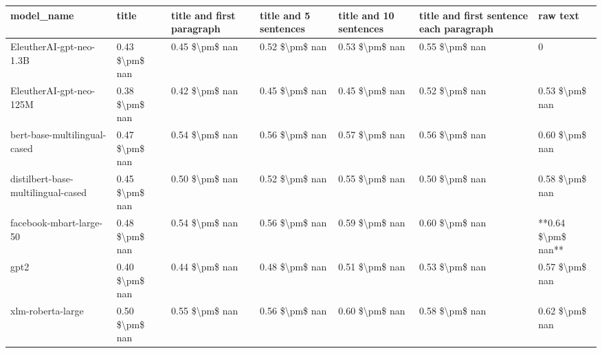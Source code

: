 \begin{tabular}{lllllll}
\toprule
                        model\_name &          title & title and first paragraph & title and 5 sentences & title and 10 sentences & title and first sentence each paragraph &           raw text \\
\midrule
           EleutherAI-gpt-neo-1.3B & 0.43 \$\textbackslash pm\$ nan &            0.45 \$\textbackslash pm\$ nan &        0.52 \$\textbackslash pm\$ nan &         0.53 \$\textbackslash pm\$ nan &                          0.55 \$\textbackslash pm\$ nan &                  0 \\
           EleutherAI-gpt-neo-125M & 0.38 \$\textbackslash pm\$ nan &            0.42 \$\textbackslash pm\$ nan &        0.45 \$\textbackslash pm\$ nan &         0.45 \$\textbackslash pm\$ nan &                          0.52 \$\textbackslash pm\$ nan &     0.53 \$\textbackslash pm\$ nan \\
      bert-base-multilingual-cased & 0.47 \$\textbackslash pm\$ nan &            0.54 \$\textbackslash pm\$ nan &        0.56 \$\textbackslash pm\$ nan &         0.57 \$\textbackslash pm\$ nan &                          0.56 \$\textbackslash pm\$ nan &     0.60 \$\textbackslash pm\$ nan \\
distilbert-base-multilingual-cased & 0.45 \$\textbackslash pm\$ nan &            0.50 \$\textbackslash pm\$ nan &        0.52 \$\textbackslash pm\$ nan &         0.55 \$\textbackslash pm\$ nan &                          0.50 \$\textbackslash pm\$ nan &     0.58 \$\textbackslash pm\$ nan \\
           facebook-mbart-large-50 & 0.48 \$\textbackslash pm\$ nan &            0.54 \$\textbackslash pm\$ nan &        0.56 \$\textbackslash pm\$ nan &         0.59 \$\textbackslash pm\$ nan &                          0.60 \$\textbackslash pm\$ nan & **0.64 \$\textbackslash pm\$ nan** \\
                              gpt2 & 0.40 \$\textbackslash pm\$ nan &            0.44 \$\textbackslash pm\$ nan &        0.48 \$\textbackslash pm\$ nan &         0.51 \$\textbackslash pm\$ nan &                          0.53 \$\textbackslash pm\$ nan &     0.57 \$\textbackslash pm\$ nan \\
                 xlm-roberta-large & 0.50 \$\textbackslash pm\$ nan &            0.55 \$\textbackslash pm\$ nan &        0.56 \$\textbackslash pm\$ nan &         0.60 \$\textbackslash pm\$ nan &                          0.58 \$\textbackslash pm\$ nan &     0.62 \$\textbackslash pm\$ nan \\
\bottomrule
\end{tabular}
